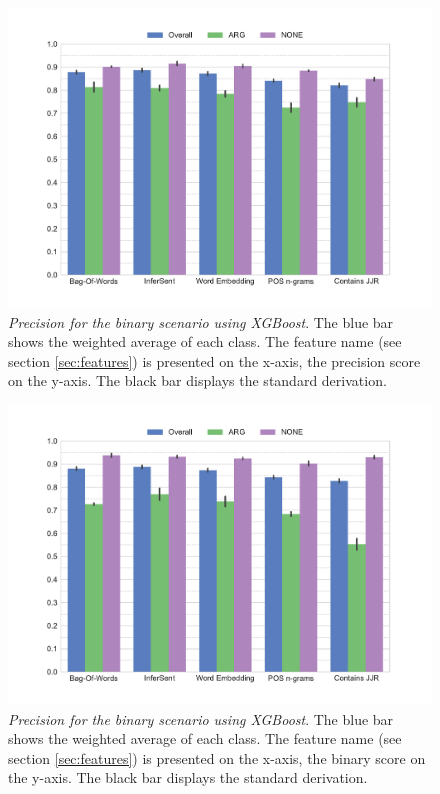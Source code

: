 \begin{figure}[tb]
         \caption{\emph{Precision for the binary scenario using XGBoost}. The blue bar shows the weighted average of each class. The feature name (see section \ref{sec:features}) is presented on the x-axis, the precision score on the y-axis. The black bar displays the standard derivation.} 
    \label{fig:2_precision}
    \centering
	\includegraphics[width=0.9\linewidth]{images/experiments/precision-True}
    \end{figure}
    
    \begin{figure}[tb]
              \caption{\emph{Precision for the binary scenario using XGBoost}. The blue bar shows the weighted average of each class. The feature name (see section \ref{sec:features}) is presented on the x-axis, the binary score on the y-axis. The black bar displays the standard derivation.} 
       \label{fig:2_recall}
 \centering
	\includegraphics[width=0.9\linewidth]{images/experiments/recall-True}

\end{figure}



